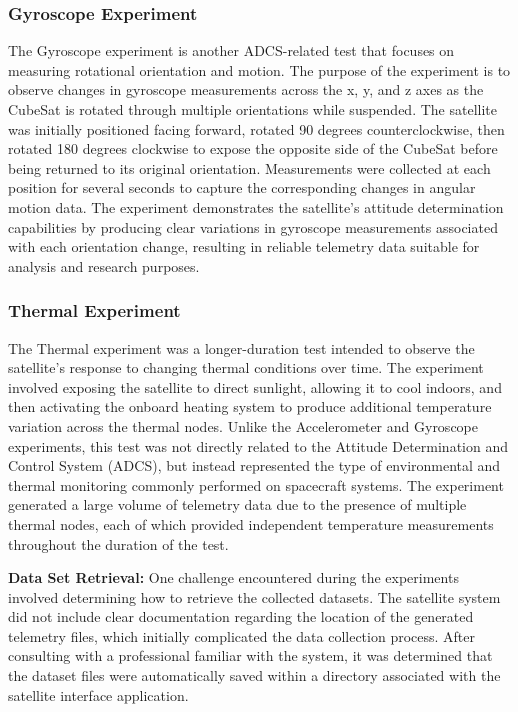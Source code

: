 \documentclass[conference]{IEEEtran}
\begin{document}
\subsubsection{Gyroscope Experiment}
The Gyroscope experiment is another ADCS-related test that focuses on measuring rotational orientation and motion. The purpose of the experiment is to observe changes in gyroscope measurements across the x, y, and z axes as the CubeSat is rotated through multiple orientations while suspended. The satellite was initially positioned facing forward, rotated 90 degrees counterclockwise, then rotated 180 degrees clockwise to expose the opposite side of the CubeSat before being returned to its original orientation. Measurements were collected at each position for several seconds to capture the corresponding changes in angular motion data. The experiment demonstrates the satellite’s attitude determination capabilities by producing clear variations in gyroscope measurements associated with each orientation change, resulting in reliable telemetry data suitable for analysis and research purposes.


\subsubsection{Thermal Experiment}
The Thermal experiment was a longer-duration test intended to observe the satellite’s response to changing thermal conditions over time. The experiment involved exposing the satellite to direct sunlight, allowing it to cool indoors, and then activating the onboard heating system to produce additional temperature variation across the thermal nodes. Unlike the Accelerometer and Gyroscope experiments, this test was not directly related to the Attitude Determination and Control System (ADCS), but instead represented the type of environmental and thermal monitoring commonly performed on spacecraft systems. The experiment generated a large volume of telemetry data due to the presence of multiple thermal nodes, each of which provided independent temperature measurements throughout the duration of the test.


\textbf{Data Set Retrieval:}
One challenge encountered during the experiments involved determining how to retrieve the collected datasets. The satellite system did not include clear documentation regarding the location of the generated telemetry files, which initially complicated the data collection process. After consulting with a professional familiar with the system, it was determined that the dataset files were automatically saved within a directory associated with the satellite interface application.
\end{document}

